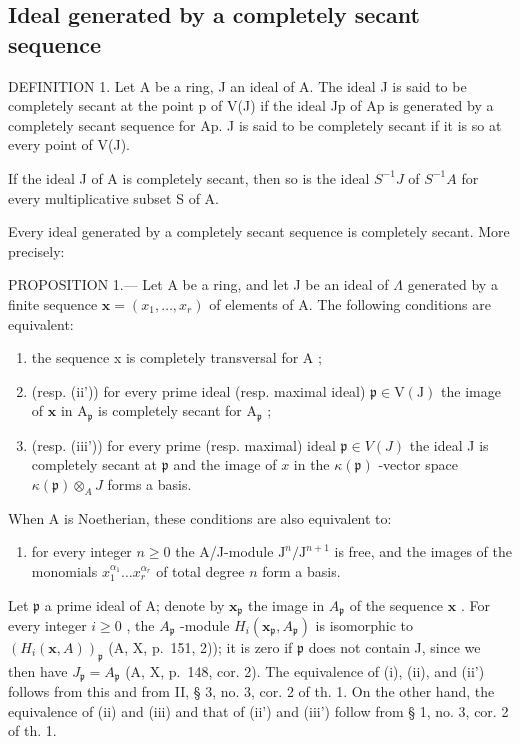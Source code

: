 \subsection{Ideal generated by a completely secant sequence}

DEFINITION 1. Let A be a ring, J an ideal of A. The ideal J is said to be completely secant at the point p of V(J) if the ideal Jp of Ap is generated by a completely secant sequence for Ap. J is said to be completely secant if it is so at every point of V(J).

If the ideal J of A is completely secant, then so is the ideal \(S^{-1}J\) of \(S^{-1}A\) for every multiplicative subset S of A.

Every ideal generated by a completely secant sequence is completely secant. More precisely:

PROPOSITION 1.--- Let A be a ring, and let J be an ideal of \(\Lambda\) generated by a finite sequence \(\mathbf{x} = (x_1, \ldots, x_r)\) of elements of A. The following conditions are equivalent:

\begin{enumerate}
\def\labelenumi{(\roman{enumi})}
\item
  the sequence x is completely transversal for A ;
\item
  (resp. (ii')) for every prime ideal (resp. maximal ideal) \(\mathfrak{p} \in \mathrm{V}(\mathrm{J})\) the image of \(\mathbf{x}\) in \(\mathrm{A}_{\mathfrak{p}}\) is completely secant for \(\mathrm{A}_{\mathfrak{p}}\) ;
\item
  (resp. (iii')) for every prime (resp. maximal) ideal \(\mathfrak{p} \in V(J)\) the ideal J is completely secant at \(\mathfrak{p}\) and the image of \(x\) in the \(\kappa(\mathfrak{p})\) -vector space \(\kappa(\mathfrak{p}) \otimes_{A} J\) forms a basis.
\end{enumerate}

When A is Noetherian, these conditions are also equivalent to:

\begin{enumerate}
\def\labelenumi{(\roman{enumi})}
\setcounter{enumi}{3}
\tightlist
\item
  for every integer \(n \geqslant 0\) the A/J-module \(\mathrm{J}^n/\mathrm{J}^{n+1}\) is free, and the images of the monomials \(x_1^{\alpha_1} \ldots x_r^{\alpha_r}\) of total degree \(n\) form a basis.
\end{enumerate}

Let \(\mathfrak{p}\) a prime ideal of A; denote by \(\mathbf{x}_{\mathfrak{p}}\) the image in \(A_{\mathfrak{p}}\) of the sequence \(\mathbf{x}\) . For every integer \(i \geqslant 0\) , the \(A_{\mathfrak{p}}\) -module \(H_i(\mathbf{x}_{\mathfrak{p}}, A_{\mathfrak{p}})\) is isomorphic to \((H_i(\mathbf{x}, A))_{\mathfrak{p}}\) (A, X, p.~151, 2)); it is zero if \(\mathfrak{p}\) does not contain J, since we then have \(J_{\mathfrak{p}} = A_{\mathfrak{p}}\) (A, X, p.~148, cor. 2). The equivalence of (i), (ii), and (ii') follows from this and from II, § 3, no. 3, cor. 2 of th. 1. On the other hand, the equivalence of (ii) and (iii) and that of (ii') and (iii') follow from § 1, no. 3, cor. 2 of th. 1.

